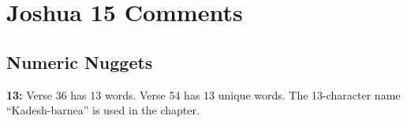 \section{Joshua 15 Comments}

\subsection{Numeric Nuggets}
\textbf{13: } Verse 36 has 13 words. Verse 54 has 13 unique words. The 13-character name ``Kadesh-barnea'' is used in the chapter.

